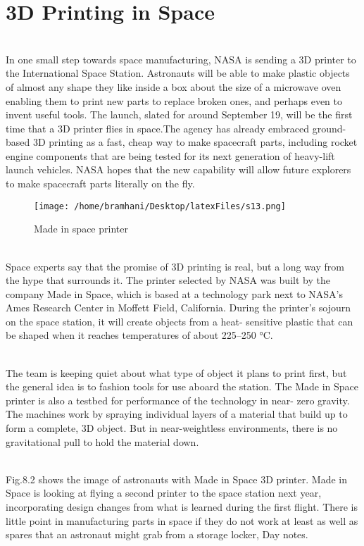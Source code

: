 \documentclass[12pt,a4paper]{report}
\begin{document}
	\section{3D Printing in Space}
	\noindent
	\\In one small step towards space manufacturing, NASA is sending a 3D printer to the
	International Space Station. Astronauts will be able to make plastic objects of almost any shape they
	like inside a box about the size of a microwave oven enabling them to print new parts to replace
	broken ones, and perhaps even to invent useful tools.
	The launch, slated for around September 19, will be the first time that a 3D printer flies in
	space.The agency has already embraced ground-based 3D printing as a fast, cheap way to make
	spacecraft parts, including rocket engine components that are being tested for its next generation of
	heavy-lift launch vehicles. NASA hopes that the new capability will allow future explorers to make
	spacecraft parts literally on the fly.\par
	
	\begin{figure}[H]
		\centering
		\texttt{[image: /home/bramhani/Desktop/latexFiles/s13.png]}
		\label{fig:Made in space printer}
		\caption{Made in space printer}
	\end{figure}
	\noindent
	\\Space experts say that the promise of 3D printing is real, but a long way from the hype that
	surrounds it. The printer selected by NASA was built by the company Made in Space, which is
	based at a technology park next to NASA’s Ames Research Center in Moffett Field, California.
	During the printer’s sojourn on the space station, it will create objects from a heat- sensitive plastic
	that can be shaped when it reaches temperatures of about 225–250 °C.
	\par
	
	\noindent
	\\The team is keeping quiet about what type of object it plans to print first, but the general idea
	is to fashion tools for use aboard the station. The Made in Space printer is also a testbed for
	performance of the technology in near- zero gravity. The machines work by spraying individual
	layers of a material that build up to form a complete, 3D object. But in near-weightless
	environments, there is no gravitational pull to hold the material down.
	\par
	
	
	\noindent
	\\Fig.8.2 shows the image of astronauts with Made in Space 3D printer. Made in Space is
	looking at flying a second printer to the space station next year, incorporating design changes from
	what is learned during the first flight. There is little point in manufacturing parts in space if they do
	not work at least as well as spares that an astronaut might grab from a storage locker, Day notes.
	\par
	
\end{document}
